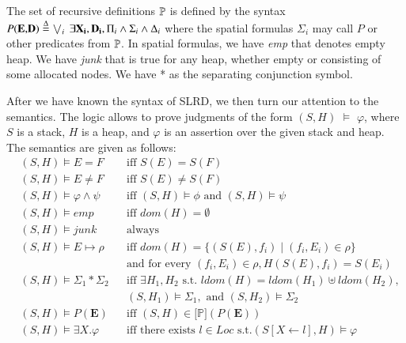 \documentclass{article}
\theoremstyle{plain}
\begin{document}
The set of recursive definitions $\mathbb{P}$ is defined by the syntax $P(\mathbf{E}\text{,}\mathbf{D}\text{)}\overset{\Delta}{=}\bigvee_{i}\ \exists \mathbf{X_i},\mathbf{D_i},\\ \Pi_i\wedge \Sigma_i \wedge \Delta_i$ where the spatial formulas $\Sigma_i$ may call $P$ or other predicates from $\mathbb{P}$. 
In spatial formulas, we have \textit{emp} that denotes empty heap. 
We have \textit{junk} that is true for any heap, whether empty or consisting of some allocated nodes. We have * as the separating conjunction symbol. %

After we have known the syntax of SLRD, we then turn our attention to the semantics. 
The logic allows to prove judgments of the form $(S,H)$ $\vDash$ $\varphi$, where $S$ is a stack, $H$ is a heap, and $\varphi$ is an assertion over the given stack and heap. 
The semantics are given as follows:
\begin{align*}
   & (S,H) \models E = F  & &\text{iff } S(E) = S(F)\\
   & (S,H) \models E \neq F & &\text{iff }  S(E) \neq S(F)\\
   & (S,H) \models \varphi \wedge \psi & &\text{iff } (S,H) \models \phi \text{ and } (S,H) \models \psi\\
    &(S,H) \models emp & &\text{iff } dom(H) = \emptyset\\
    &(S,H) \models junk  \quad  & &\text{always}\\
    &(S,H) \models E \mapsto \rho & &\text{iff } dom(H) = \{(S(E),f_i) \mid (f_i,E_i) \in \rho\} \\ & & &\text{and for every } (f_i,E_i) \in \rho , H(S(E),f_i) = S(E_i) \\
    &(S,H) \models \Sigma_1 \ast \Sigma_2 & &\text{iff }  \exists H_1 , H_2 \text{ s.t. } ldom(H)=ldom(H_1) \uplus ldom(H_2),\\ & & &(S,H_1) \models \Sigma_1, \text{ and } (S,H_2) \models \Sigma_2\\
    &(S,H) \models P(\mathbf{E}) & &\text{iff } (S,H) \in  \mathbb{[}\mathbb{P]}(P(\mathbf{E}))\\
    &(S,H) \models \exists X.\varphi & &\text{iff } \text{there exists }  \mathit{l} \in Loc \text{ s.t.}  (S[X \gets \mathit{l}], H) \models \varphi
\end{align*}
\end{document}
